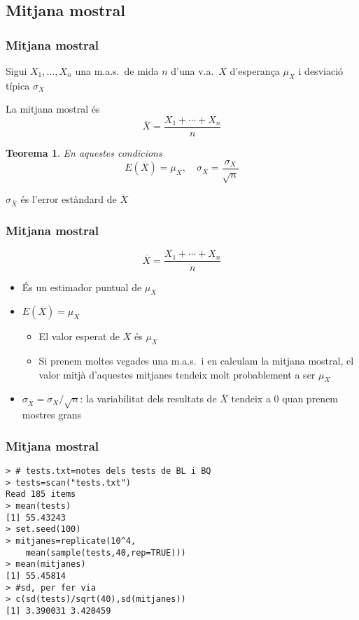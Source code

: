 \documentclass[12pt,t]{beamer}
\renewcommand{\emph}[1]{{\color{red}#1}}
\theoremstyle{plain}
\newtheorem{teorema}{Teorema}
\theoremstyle{definition}
\begin{document}
\subsection{Mitjana mostral}
\begin{frame}
\frametitle{Mitjana mostral}

Sigui $X_1,\ldots, X_n$ una m.a.s.\ de mida $n$ d'una v.a.\ $X$ d'esperança $\mu_X$ i desviació típica $\sigma_X$
\medskip

La \emph{mitjana mostral} és
$$
\overline{X}=\frac{X_1+\cdots+X_n}{n}
$$

\begin{teorema}
En aquestes condicions
$$
E(\overline{X})=\mu_X,\quad \sigma_{\overline{X}}=\frac{\sigma_X}{\sqrt{n}}
$$
\end{teorema}

 $\sigma_{\overline{X}}$ és l'\emph{error estàndard} de $\overline{X}$



\end{frame}

\begin{frame}
\frametitle{Mitjana mostral}

$$
\overline{X}=\frac{X_1+\cdots+X_n}{n}
$$
\begin{itemize}
\item És un estimador puntual de $\mu_X$
\medskip

\item \emph{$E(\overline{X})=\mu_X$}
\begin{itemize}
\item El valor esperat de $\overline{X}$ és $\mu_X$
\medskip

\item Si prenem moltes vegades una m.a.s.\ i en calculam la mitjana mostral, el valor mitjà d'aquestes mitjanes tendeix molt probablement a ser $\mu_X$
\end{itemize}
\bigskip

\item \emph{$\sigma_{\overline{X}}= \sigma_X/\sqrt{n}$}: la variabilitat dels resultats de $\overline{X}$ tendeix a 0 quan prenem mostres grans
\end{itemize}

\end{frame}

\begin{frame}[fragile]
\frametitle{Mitjana mostral}
\vspace*{-2ex}

{\small
\begin{verbatim}
> # tests.txt=notes dels tests de BL i BQ
> tests=scan("tests.txt")
Read 185 items
> mean(tests)
[1] 55.43243
> set.seed(100)
> mitjanes=replicate(10^4,
    mean(sample(tests,40,rep=TRUE)))
> mean(mitjanes)
[1] 55.45814
> #sd, per fer via
> c(sd(tests)/sqrt(40),sd(mitjanes))
[1] 3.390031 3.420459
\end{verbatim}
}

\end{frame}
\end{document}

